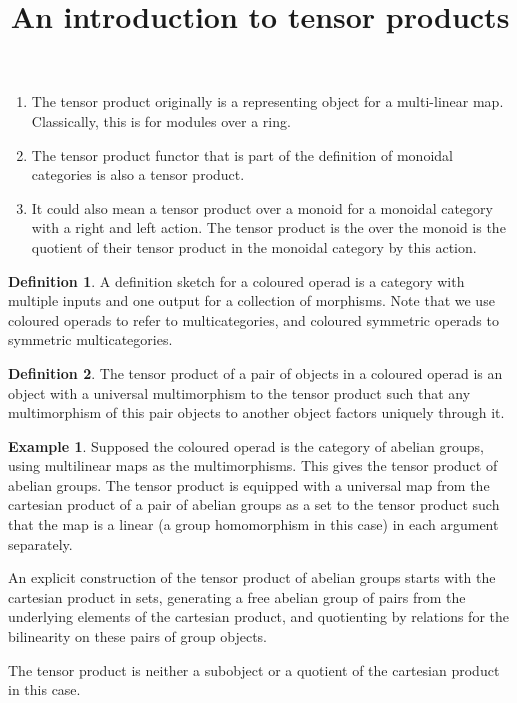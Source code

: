\documentclass[10pt]{article}
\theoremstyle{plain}%
\theoremstyle{definition}
\newtheorem{definition}{Definition}[section]
\newtheorem{example}{Example}[section]
\theoremstyle{remark}
\begin{document}
\title{An introduction to tensor products}

\maketitle

\begin{enumerate}
	\item The tensor product originally is a representing object for a multi-linear map. Classically, this is for modules over a ring.
	\item The tensor product functor that is part of the definition of monoidal categories is also a tensor product.
	\item It could also mean a tensor product over a monoid for a monoidal category with a right and left action. The tensor product is the over the monoid is the quotient of their tensor product in the monoidal category by this action.
\end{enumerate}

\begin{definition}
	A definition sketch for a coloured operad is a category with multiple inputs and one output for a collection of morphisms. Note that we use coloured operads to refer to multicategories, and coloured symmetric operads to symmetric multicategories.
\end{definition}

\begin{definition}
	The tensor product of a pair of objects in a coloured operad is an object with a universal multimorphism to the tensor product such that any multimorphism of this pair objects to another object factors uniquely through it.
\end{definition}

\begin{example}
	Supposed the coloured operad is the category of abelian groups, using multilinear maps as the multimorphisms. This gives the tensor product of abelian groups. The tensor product is equipped with a universal map from the cartesian product of a pair of abelian groups as a set to the tensor product such that the map is a linear (a group homomorphism in this case) in each argument separately.

	An explicit construction of the tensor product of abelian groups starts with the cartesian product in sets, generating a free abelian group of pairs from the underlying elements of the cartesian product, and quotienting by relations for the bilinearity on these pairs of group objects.
	
	The tensor product is neither a subobject or a quotient of the cartesian product in this case.
\end{example}
\end{document}
